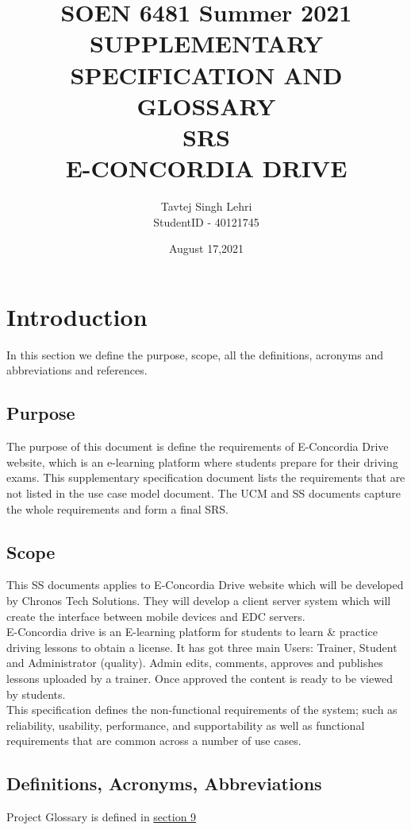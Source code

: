 \documentclass{article}
\title{\normalsize {SOEN 6481 Summer 2021}\\[1.0cm]
\large \textbf{\uppercase{Supplementary specification and glossary}}\\
\large \textbf{\uppercase{SRS}} \\
\huge \textbf{\uppercase{e-concordia drive}}\\
\normalsize \vspace*{2\baselineskip}
}
\author{{Tavtej Singh Lehri\\
StudentID - 40121745}}
\date{August 17,2021}
\begin{document}
\maketitle

\tableofcontents
\clearpage


\RaggedRight
\section{ Introduction}
In this section we define the purpose, scope, all the definitions, acronyms and abbreviations and references.
\subsection{ Purpose}
The purpose of this document is define the requirements of E-Concordia Drive website, which is an e-learning platform where students prepare for their driving exams. This supplementary specification document lists the requirements that are not listed in the use case model document. The UCM and SS documents capture the whole requirements and form a final SRS.
\subsection{ Scope}
This SS documents applies to E-Concordia Drive website which will be developed by Chronos Tech Solutions. They will develop a client server system which will create the interface between mobile devices and EDC servers.\\[0.2cm]

E-Concordia drive is an E-learning platform for students to learn \& practice driving lessons to obtain a license. It has got three main Users: Trainer, Student and Administrator (quality). Admin edits, comments, approves and publishes  lessons uploaded by a trainer.  Once approved the content is ready to be viewed by students.\\[0.2cm]
This specification defines the non-functional requirements of the system; such as reliability, usability, performance, and supportability as well as functional requirements that are common across a number of use cases.
\subsection{ Definitions, Acronyms, Abbreviations}
Project Glossary is defined in \hyperref[sec:Glossary]{section 9}
\end{document}
